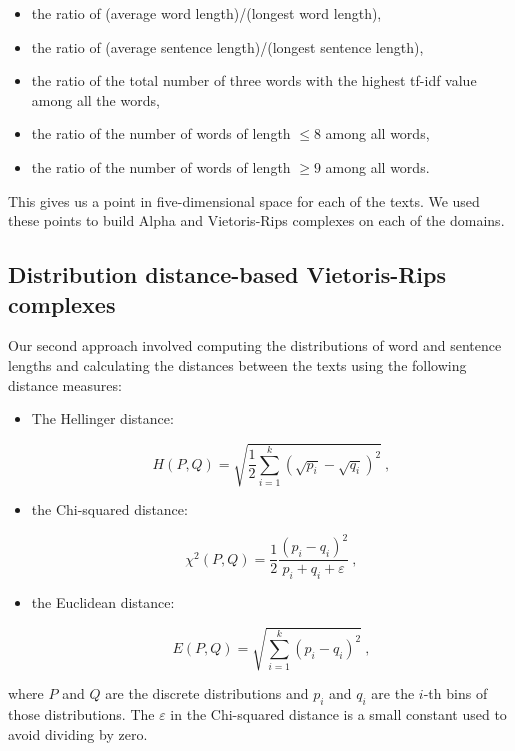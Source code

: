\documentclass[12pt,a4paper]{amsart}
\begin{document}
\begin{itemize}
  \item the ratio of (average word length)/(longest word length),
  \item the ratio of (average sentence length)/(longest sentence length),
  \item the ratio of the total number of three words with the highest tf-idf
    value among all the words,
  \item the ratio of the number of words of length $\le 8$ among all words,
  \item the ratio of the number of words of length $\ge 9$ among all words.
\end{itemize}

This gives us a point in five-dimensional space for each of the texts. We used
these points to build Alpha and Vietoris-Rips complexes on each of the domains.

\subsection{Distribution distance-based Vietoris-Rips complexes}

Our second approach involved computing the distributions of word and sentence
lengths and calculating the distances between the texts using the following
distance measures:

\begin{itemize}
\item The Hellinger distance:

\begin{equation*}
  H(P,Q) = \sqrt{\frac{1}{2} \sum_{i=1}^k\left(\sqrt{p_i} -
    \sqrt{q_i}\right)^2}\ ,
\end{equation*}

\item the Chi-squared distance:

\begin{equation*}
  \chi^2(P,Q) = \frac{1}{2} \frac{(p_i - q_i)^2}{p_i + q_i + \varepsilon}\ ,
\end{equation*}

\item the Euclidean distance:

\begin{equation*}
  E(P,Q) = \sqrt{\sum_{i=1}^k\left(p_i - q_i\right)^2}\ ,
\end{equation*}
\end{itemize}

\noindent
where $P$ and $Q$ are the discrete distributions and $p_i$ and $q_i$ are the
$i$-th bins of those distributions. The $\varepsilon$ in the Chi-squared
distance is a small constant used to avoid dividing by zero.
\end{document}
